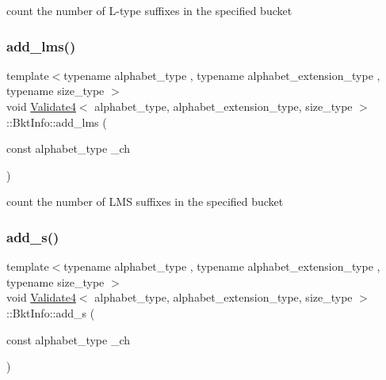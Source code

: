 count the number of L-\/type suffixes in the specified bucket 

\mbox{\label{struct_validate4_1_1_bkt_info_a5875efc6696925c0932f262174c2cc37}} 
\subsubsection{\texorpdfstring{add\+\_\+lms()}{add\_lms()}}
{\footnotesize\ttfamily template$<$typename alphabet\+\_\+type , typename alphabet\+\_\+extension\+\_\+type , typename size\+\_\+type $>$ \\
void \hyperlink{class_validate4}{Validate4}$<$ alphabet\+\_\+type, alphabet\+\_\+extension\+\_\+type, size\+\_\+type $>$\+::Bkt\+Info\+::add\+\_\+lms (\begin{DoxyParamCaption}\item[{const alphabet\+\_\+type}]{\+\_\+ch }\end{DoxyParamCaption})\hspace{0.3cm}{\ttfamily [inline]}}



count the number of L\+MS suffixes in the specified bucket 

\mbox{\label{struct_validate4_1_1_bkt_info_a9c11b8915349954523623d9e7b0a2c2a}} 
\subsubsection{\texorpdfstring{add\+\_\+s()}{add\_s()}}
{\footnotesize\ttfamily template$<$typename alphabet\+\_\+type , typename alphabet\+\_\+extension\+\_\+type , typename size\+\_\+type $>$ \\
void \hyperlink{class_validate4}{Validate4}$<$ alphabet\+\_\+type, alphabet\+\_\+extension\+\_\+type, size\+\_\+type $>$\+::Bkt\+Info\+::add\+\_\+s (\begin{DoxyParamCaption}\item[{const alphabet\+\_\+type}]{\+\_\+ch }\end{DoxyParamCaption})\hspace{0.3cm}{\ttfamily [inline]}}



